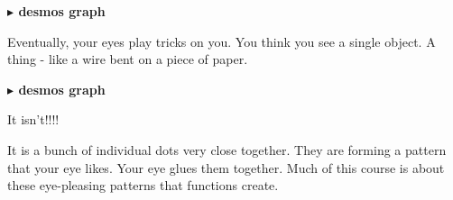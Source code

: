 \documentclass{ximera}
\begin{document}
\textbf{\textcolor{blue!55!black}{$\blacktriangleright$ desmos graph}} 
\begin{center}
\end{center}




Eventually, your eyes play tricks on you.  You think you see a single object.  A thing - like a wire bent on a piece of paper.



\begin{image}
\end{image}







\textbf{\textcolor{blue!55!black}{$\blacktriangleright$ desmos graph}} 
\begin{center}
\end{center}






\large{It isn't!!!!}




It is a bunch of individual dots very close together. They are forming a pattern that your eye likes. Your eye glues them together.  Much of this course is about these eye-pleasing patterns that functions create.
\end{document}
